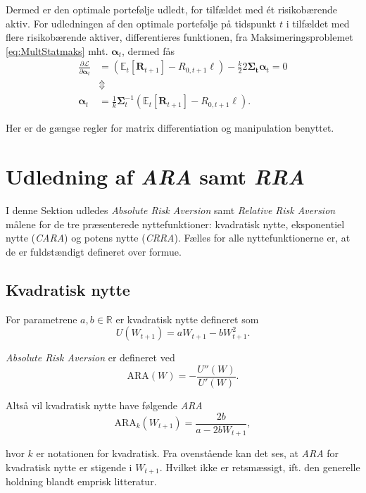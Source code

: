 \documentclass[
  a4paper,
  oneside]{memoir}
\begin{document}
Dermed er den optimale portefølje udledt, for tilfældet med ét risikobærende aktiv. For udledningen af den optimale portefølje på tidspunkt \(t\) i tilfældet med flere risikobærende aktiver, differentieres funktionen, fra Maksimeringsproblemet \eqref{eq:MultStatmaks} mht. \(\bm{\alpha}_t\), dermed fås
\begin{align*}
\frac{\partial \mathcal{L}}{\partial \bm{\alpha}_t} &= \left(\mathbb{E}_t\left[\bm{R}_{t+1}\right]- R_{0,t+1}\bm{\ell}\right) - \frac{k}{2}2\bm{\Sigma_t}\bm{\alpha}_t = 0\\
&\Updownarrow\\
\bm{\alpha}_t&=\frac{1}{k}\bm{\Sigma}_t^{-1}\left(\mathbb{E}_t\left[\bm{R}_{t+1}\right]-R_{0,t+1}\bm{\ell}\right).
\end{align*}

Her er de gængse regler for matrix differentiation og manipulation benyttet.

\hypertarget{udledning-af-ara-samt-rra}{%
\section{\texorpdfstring{Udledning af \emph{ARA} samt \emph{RRA}}{Udledning af ARA samt RRA}}\label{udledning-af-ara-samt-rra}}

I denne Sektion udledes \emph{Absolute Risk Aversion} samt \emph{Relative Risk Aversion} målene for de tre præsenterede nyttefunktioner: kvadratisk nytte, eksponentiel nytte (\emph{CARA}) og potens nytte (\emph{CRRA}). Fælles for alle nyttefunktionerne er, at de er fuldstændigt defineret over formue.

\hypertarget{kvadratisk-nytte-1}{%
\subsection{Kvadratisk nytte}\label{kvadratisk-nytte-1}}

For parametrene \(a,b\in\mathbb{R}\) er kvadratisk nytte defineret som
\begin{equation*}
U(W_{t+1})=aW_{t+1}-bW_{t+1}^2.
\end{equation*}

\emph{Absolute Risk Aversion} er defineret ved
\[\text{ARA}(W)=-\frac{U''(W)}{U'(W)}.\]

Altså vil kvadratisk nytte have følgende \emph{ARA}
\[\text{ARA}_k(W_{t+1})=\frac{2b}{a-2bW_{t+1}},\]

hvor \(k\) er notationen for kvadratisk. Fra ovenstående kan det ses, at \emph{ARA} for kvadratisk nytte er stigende i \(W_{t+1}\). Hvilket ikke er retsmæssigt, ift. den generelle holdning blandt emprisk litteratur.
\end{document}
